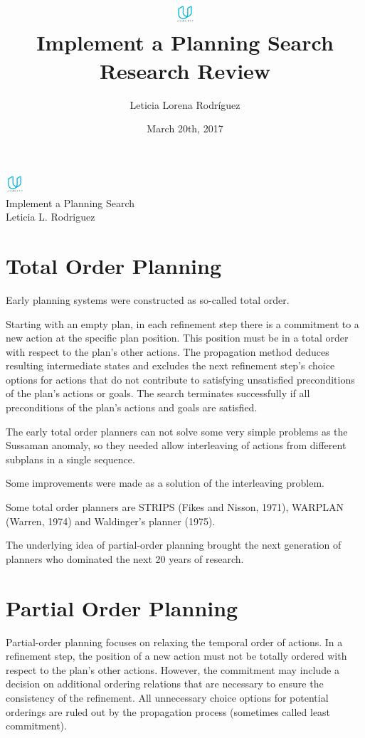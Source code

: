 \documentclass[10pt, a4paper,english]{article}
\author{\normalsize{Leticia Lorena Rodr\'iguez}}
\date{\normalsize{March 20th, 2017}} %
\title{
	\includegraphics[width=0.05\textwidth]{udacity-small.png}\\
Implement a Planning Search \\
\large {Research Review}
} %
\begin{document}
\begin{center}

\includegraphics[width=0.05\textwidth]{udacity-small.png}\\
Implement a Planning Search \\
Leticia L. Rodriguez \\
\end{center}

\section{Total Order Planning}

Early planning systems were constructed as so-called total order. 

Starting with an empty plan, in each refinement step there is a commitment to a new action at the specific plan position. This position must be in a total order with respect to the plan's other actions. The propagation method deduces resulting intermediate states and excludes the next refinement step's choice options for actions that do not contribute to satisfying unsatisfied preconditions of the plan's actions or goals. The search terminates successfully if all preconditions of the plan's actions and goals are satisfied.

The early total order planners can not solve some very simple problems as the Sussaman anomaly, so they needed allow interleaving of actions from different subplans in a single sequence.

Some improvements were made as a solution of the interleaving problem. 

Some total order planners are STRIPS (Fikes and Nisson, 1971), WARPLAN (Warren, 1974) and Waldinger's planner (1975). 

The underlying idea of partial-order planning brought the next generation of planners who dominated the next 20 years of research.


\section{Partial Order Planning}

Partial-order planning focuses on relaxing the temporal order of actions. In a refinement step, the position of a new action must not be totally ordered with respect to the plan's other actions. However, the commitment may include a decision on additional ordering relations that are necessary to ensure the consistency of the refinement. All unnecessary choice options for potential orderings are ruled out by the propagation process (sometimes called least commitment).
\end{document}
